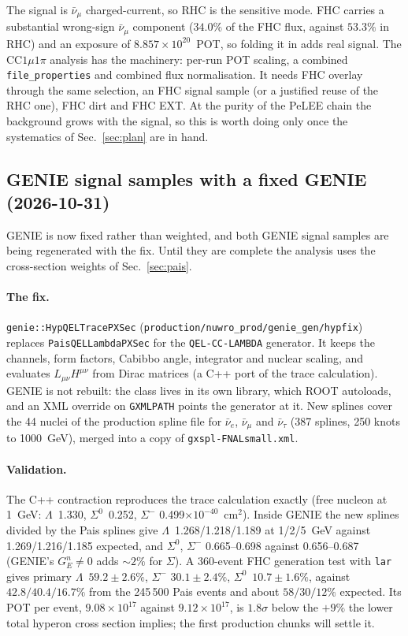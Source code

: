 \documentclass[11pt,a4paper]{article}
\newcommand{\Szero}{\ensuremath{\Sigma^{0}}}
\newcommand{\Lam}{\ensuremath{\Lambda}}
\newcommand{\numubar}{\ensuremath{\bar{\nu}_\mu}}
\begin{document}
The signal is $\numubar$ charged-current, so RHC is the sensitive mode. FHC carries a
substantial wrong-sign $\numubar$ component ($34.0\%$ of the FHC flux, against $53.3\%$
in RHC) and an exposure of $8.857\times10^{20}$~POT, so folding it in adds real signal.
The CC$1\mu1\pi$ analysis has the machinery: per-run POT scaling, a combined
\texttt{file\_properties} and combined flux normalisation. It needs FHC overlay
through the same selection, an FHC signal sample (or a justified reuse of the RHC
one), FHC dirt and FHC EXT. At the purity of the PeLEE chain the background grows with
the signal, so this is worth doing only once the systematics of Sec.~\ref{sec:plan}
are in hand.

\subsection{GENIE signal samples with a fixed GENIE (2026-10-31)}
\label{sec:fhcplan}
GENIE is now fixed rather than weighted, and both GENIE signal samples are being regenerated
with the fix. Until they are complete the analysis uses the cross-section weights of
Sec.~\ref{sec:pais}.

\paragraph{The fix.} \texttt{genie::HypQELTracePXSec}
(\texttt{production/nuwro\_prod/genie\_gen/hypfix}) replaces \texttt{PaisQELLambdaPXSec}
for the \texttt{QEL-CC-LAMBDA} generator. It keeps the channels, form factors, Cabibbo angle,
integrator and nuclear scaling, and evaluates $L_{\mu\nu}H^{\mu\nu}$ from Dirac matrices
(a C++ port of the trace calculation). GENIE is not rebuilt: the class lives in its own
library, which ROOT autoloads, and an XML override on \texttt{GXMLPATH} points the generator at
it. New splines cover the 44 nuclei of the production spline file for $\bar\nu_e$,
$\numubar$ and $\bar\nu_\tau$ (387 splines, 250 knots to 1000~GeV), merged into a copy of
\texttt{gxspl-FNALsmall.xml}.

\paragraph{Validation.} The C++ contraction reproduces the trace calculation exactly
(free nucleon at 1~GeV: \Lam\ 1.330, \Szero\ 0.252, $\Sigma^-$ 0.499$\times10^{-40}$~cm$^2$).
Inside GENIE the new splines divided by the Pais splines give \Lam\ 1.268/1.218/1.189 at
1/2/5~GeV against 1.269/1.216/1.185 expected, and \Szero, $\Sigma^-$ 0.665--0.698 against
0.656--0.687 (GENIE's $G_E^n\neq0$ adds $\sim2\%$ for $\Sigma$). A 360-event FHC generation
test with \texttt{lar} gives primary \Lam\ $59.2\pm2.6\%$, $\Sigma^-$ $30.1\pm2.4\%$, \Szero\
$10.7\pm1.6\%$, against $42.8/40.4/16.7\%$ from the 245\,500 Pais events and about
$58/30/12\%$ expected. Its POT per event, $9.08\times10^{17}$ against $9.12\times10^{17}$, is
$1.8\sigma$ below the $+9\%$ the lower total hyperon cross section implies; the first
production chunks will settle it.
\end{document}
